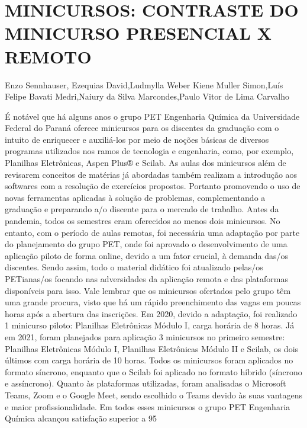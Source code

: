 

\section{MINICURSOS: CONTRASTE DO MINICURSO PRESENCIAL X REMOTO}

Enzo Sennhauser, Ezequias David,Ludmylla Weber Kiene Muller Simon,Luís Felipe Bavati Medri,Naiury da Silva Marcondes,Paulo Vitor de Lima Carvalho

É notável que há alguns anos o grupo PET Engenharia Química da Universidade Federal
do Paraná oferece minicursos para os discentes da graduação com o intuito de enriquecer e
auxiliá-los por meio de noções básicas de diversos programas utilizados nos ramos de tecnologia
e engenharia, como, por exemplo, Planilhas Eletrônicas, Aspen Plus® e Scilab.
As aulas dos minicursos além de revisarem conceitos de matérias já abordadas também
realizam a introdução aos softwares com a resolução de exercícios propostos. Portanto
promovendo o uso de novas ferramentas aplicadas à solução de problemas, complementando a
graduação e preparando a/o discente para o mercado de trabalho.
Antes da pandemia, todos os semestres eram oferecidos ao menos dois minicursos. No
entanto, com o período de aulas remotas, foi necessária uma adaptação por parte do
planejamento do grupo PET, onde foi aprovado o desenvolvimento de uma aplicação piloto de
forma online, devido a um fator crucial, à demanda das/os discentes.
Sendo assim, todo o material didático foi atualizado pelas/os PETianas/os focando nas
adversidades da aplicação remota e das plataformas disponíveis para isso. Vale lembrar que os
minicursos ofertados pelo grupo têm uma grande procura, visto que há um rápido preenchimento
das vagas em poucas horas após a abertura das inscrições. Em 2020, devido a adaptação, foi
realizado 1 minicurso piloto: Planilhas Eletrônicas Módulo I, carga horária de 8 horas. Já em
2021, foram planejados para aplicação 3 minicursos no primeiro semestre: Planilhas Eletrônicas
Módulo I, Planilhas Eletrônicas Módulo II e Scilab, os dois últimos com carga horária de 10
horas. Todos os minicursos foram aplicados no formato síncrono, enquanto que o Scilab foi
aplicado no formato híbrido (síncrono e assíncrono). Quanto às plataformas utilizadas, foram
analisadas o Microsoft Teams, Zoom e o Google Meet, sendo escolhido o Teams devido às suas
vantagens e maior profissionalidade.
Em todos esses minicursos o grupo PET Engenharia Química alcançou satisfação
superior a 95%
